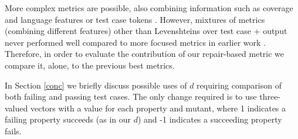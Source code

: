 More complex metrics are possible, also combining information such as
coverage and language features or test case tokens \cite{PLDI13}.
However, mixtures of metrics (combining different features) other than
Levenshteins \cite{lev} over test case + output never performed well
compared to more focused metrics in earlier work \cite{PLDI13}.
Therefore, in order to evaluate the contribution of our repair-based
metric we compare it, alone, to the previous best metrics.

In Section \ref{conc} we briefly discuss possible uses of $d$
requiring comparison of both failing and passing test cases. The only
change required is to use three-valued vectors with a value for each
property and mutant, where 1 indicates a failing property succeeds (as
in our $d$) and -1 indicates a succeeding property fails.
